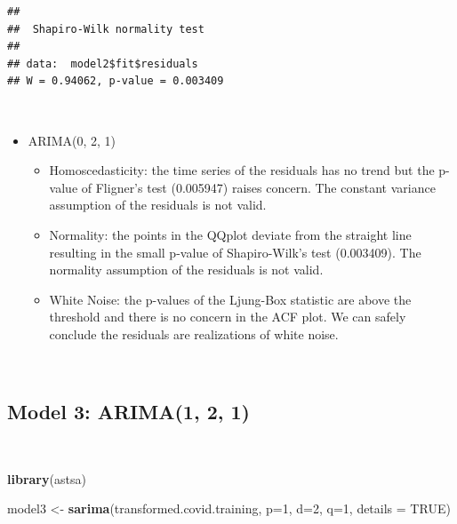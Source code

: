 \documentclass[]{article}
\newenvironment{Shaded}{\begin{snugshade}}{\end{snugshade}}
\newcommand{\DataTypeTok}[1]{\textcolor[rgb]{0.13,0.29,0.53}{#1}}
\newcommand{\DecValTok}[1]{\textcolor[rgb]{0.00,0.00,0.81}{#1}}
\newcommand{\KeywordTok}[1]{\textcolor[rgb]{0.13,0.29,0.53}{\textbf{#1}}}
\newcommand{\NormalTok}[1]{#1}
\newcommand{\OperatorTok}[1]{\textcolor[rgb]{0.81,0.36,0.00}{\textbf{#1}}}
\newcommand{\OtherTok}[1]{\textcolor[rgb]{0.56,0.35,0.01}{#1}}
\newcommand{\StringTok}[1]{\textcolor[rgb]{0.31,0.60,0.02}{#1}}
\providecommand{\tightlist}{%
  \setlength{\itemsep}{0pt}\setlength{\parskip}{0pt}}
\begin{document}
\begin{Shaded}
\end{Shaded}

\begin{verbatim}
## 
##  Shapiro-Wilk normality test
## 
## data:  model2$fit$residuals
## W = 0.94062, p-value = 0.003409
\end{verbatim}

\(\;\)

\begin{itemize}
\tightlist
\item
  ARIMA(0, 2, 1)

  \begin{itemize}
  \tightlist
  \item
    Homoscedasticity: the time series of the residuals has no trend but
    the p-value of Fligner's test (0.005947) raises concern. The
    constant variance assumption of the residuals is not valid.
  \item
    Normality: the points in the QQplot deviate from the straight line
    resulting in the small p-value of Shapiro-Wilk's test (0.003409).
    The normality assumption of the residuals is not valid.
  \item
    White Noise: the p-values of the Ljung-Box statistic are above the
    threshold and there is no concern in the ACF plot. We can safely
    conclude the residuals are realizations of white noise.
  \end{itemize}
\end{itemize}

\(\;\)

\hypertarget{model-3-arima1-2-1}{%
\subsection{Model 3: ARIMA(1, 2, 1)}\label{model-3-arima1-2-1}}

\(\;\)

\begin{Shaded}
\begin{Highlighting}[]
\KeywordTok{library}\NormalTok{(astsa)}

\NormalTok{model3 <-}\StringTok{ }\KeywordTok{sarima}\NormalTok{(transformed.covid.training, }\DataTypeTok{p=}\DecValTok{1}\NormalTok{, }\DataTypeTok{d=}\DecValTok{2}\NormalTok{, }\DataTypeTok{q=}\DecValTok{1}\NormalTok{, }\DataTypeTok{details =} \OtherTok{TRUE}\NormalTok{)}
\end{Highlighting}
\end{Shaded}
\end{document}

